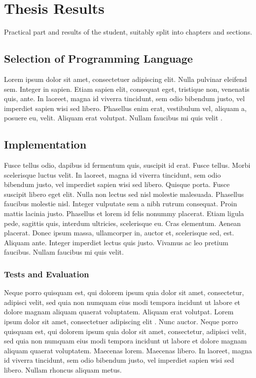 \chapter{Thesis Results}

Practical part and results of the student, suitably split into chapters and sections.

\section{Selection of Programming Language}
Lorem ipsum dolor sit amet, consectetuer adipiscing elit. Nulla pulvinar eleifend sem. Integer in sapien. Etiam sapien elit, consequat eget, tristique non, venenatis quis, ante. In laoreet, magna id viverra tincidunt, sem odio bibendum justo, vel imperdiet sapien wisi sed libero. Phasellus enim erat, vestibulum vel, aliquam a, posuere eu, velit. Aliquam erat volutpat. Nullam faucibus mi quis velit \cite{sr02/2009}.

\section{Implementation}
Fusce tellus odio, dapibus id fermentum quis, suscipit id erat. Fusce tellus. Morbi scelerisque luctus velit. In laoreet, magna id viverra tincidunt, sem odio bibendum justo, vel imperdiet sapien wisi sed libero. Quisque porta. Fusce suscipit libero eget elit. Nulla non lectus sed nisl molestie malesuada. Phasellus faucibus molestie nisl. Integer vulputate sem a nibh rutrum consequat. Proin mattis lacinia justo. Phasellus et lorem id felis nonummy placerat. Etiam ligula pede, sagittis quis, interdum ultricies, scelerisque eu. Cras elementum. Aenean placerat. Donec ipsum massa, ullamcorper in, auctor et, scelerisque sed, est. Aliquam ante. Integer imperdiet lectus quis justo. Vivamus ac leo pretium faucibus. Nullam faucibus mi quis velit.

\subsection{Tests and Evaluation}
Neque porro quisquam est, qui dolorem ipsum quia dolor sit amet, consectetur, adipisci velit, sed quia non numquam eius modi tempora incidunt ut labore et dolore magnam aliquam quaerat voluptatem. Aliquam erat volutpat. Lorem ipsum dolor sit amet, consectetuer adipiscing elit \cite{sr02/2009,pravidla}. Nunc auctor. Neque porro quisquam est, qui dolorem ipsum quia dolor sit amet, consectetur, adipisci velit, sed quia non numquam eius modi tempora incidunt ut labore et dolore magnam aliquam quaerat voluptatem. Maecenas lorem. Maecenas libero. In laoreet, magna id viverra tincidunt, sem odio bibendum justo, vel imperdiet sapien wisi sed libero. Nullam rhoncus aliquam metus.

